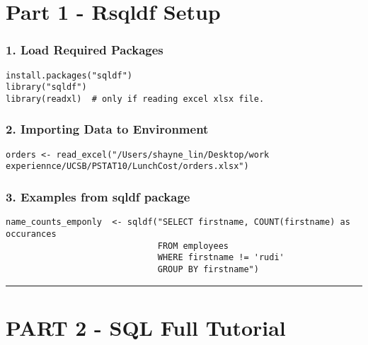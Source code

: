 \documentclass[
]{article}
\author{}
\date{\vspace{-2.5em}}
\begin{document}
\hypertarget{part-1---rsqldf-setup}{%
\section{Part 1 - Rsqldf Setup}\label{part-1---rsqldf-setup}}

\hypertarget{load-required-packages}{%
\subsubsection{1. Load Required Packages}\label{load-required-packages}}

\begin{verbatim}
install.packages("sqldf")  
library("sqldf")  
library(readxl)  # only if reading excel xlsx file.
\end{verbatim}

\hypertarget{importing-data-to-environment}{%
\subsubsection{2. Importing Data to
Environment}\label{importing-data-to-environment}}

\begin{verbatim}
orders <- read_excel("/Users/shayne_lin/Desktop/work experiennce/UCSB/PSTAT10/LunchCost/orders.xlsx")  
\end{verbatim}

\hypertarget{examples-from-sqldf-package}{%
\subsubsection{3. Examples from sqldf
package}\label{examples-from-sqldf-package}}

\begin{verbatim}
name_counts_emponly  <- sqldf("SELECT firstname, COUNT(firstname) as occurances 
                              FROM employees 
                              WHERE firstname != 'rudi' 
                              GROUP BY firstname")
\end{verbatim}

\begin{center}\rule{0.5\linewidth}{0.5pt}\end{center}

\hypertarget{part-2---sql-full-tutorial}{%
\section{PART 2 - SQL Full Tutorial}\label{part-2---sql-full-tutorial}}
\end{document}

